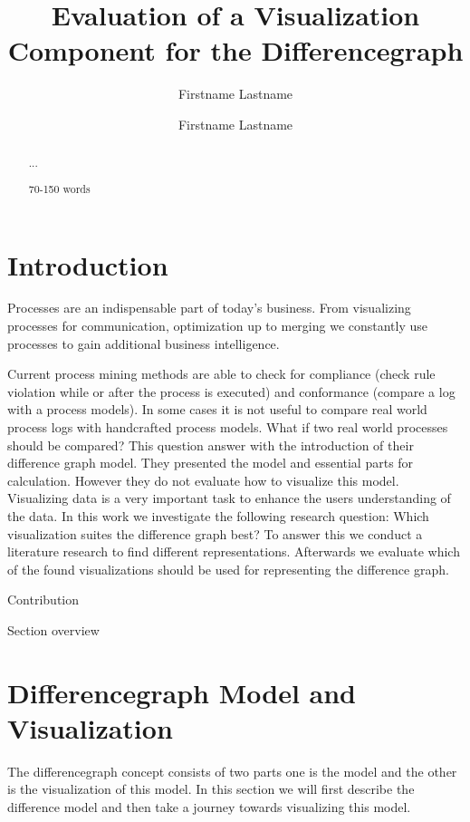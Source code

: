 \documentclass{llncs}
\begin{document}
\title{Evaluation of a Visualization Component for the Differencegraph}
\author{Firstname Lastname \and Firstname Lastname}
\maketitle
\begin{abstract}
...

70-150 words
\end{abstract}



\section{Introduction}
\label{sec:Introduction} %

Processes are an indispensable part of today’s business. From visualizing processes for communication, optimization up to merging we constantly use processes to gain additional business intelligence.

Current process mining methods are able to check for compliance (check rule violation while or after the process is executed) and conformance (compare a log with a process models).
In some cases it is not useful to compare real world process logs with handcrafted process models. What if two real world processes should be compared?
This question answer \cite{lit:VisuApprDiffAnalysis} with the introduction of their difference graph model. They presented the model and essential parts for calculation. However they do not evaluate how to visualize this model. Visualizing data is a very important task to enhance the users understanding of the data.
In this work we investigate the following research question: Which visualization suites the difference graph best? To answer this we conduct a literature research to find different representations. Afterwards we evaluate which of the found visualizations should be used for representing the difference graph.


Contribution

Section overview

\section{Differencegraph Model and Visualization} %
\label{sec:DiffgraphModel}
The differencegraph concept \cite{lit:VisuApprDiffAnalysis} consists of two parts one is the model and the other is the visualization of this model. In this section we will  first describe the difference model and then take a journey towards visualizing this model.
\end{document}
